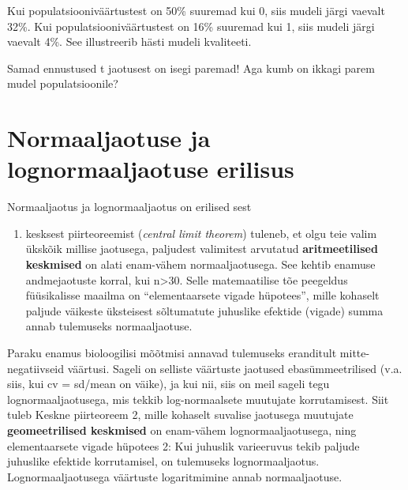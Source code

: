 \documentclass[]{book}
\newenvironment{Shaded}{\begin{snugshade}}{\end{snugshade}}
\newcommand{\KeywordTok}[1]{\textcolor[rgb]{0.13,0.29,0.53}{\textbf{#1}}}
\newcommand{\DecValTok}[1]{\textcolor[rgb]{0.00,0.00,0.81}{#1}}
\newcommand{\StringTok}[1]{\textcolor[rgb]{0.31,0.60,0.02}{#1}}
\newcommand{\CommentTok}[1]{\textcolor[rgb]{0.56,0.35,0.01}{\textit{#1}}}
\newcommand{\OperatorTok}[1]{\textcolor[rgb]{0.81,0.36,0.00}{\textbf{#1}}}
\newcommand{\NormalTok}[1]{#1}
\providecommand{\tightlist}{%
  \setlength{\itemsep}{0pt}\setlength{\parskip}{0pt}}
\begin{document}
Kui populatsiooniväärtustest on 50\% suuremad kui 0, siis mudeli järgi
vaevalt 32\%. Kui populatsiooniväärtustest on 16\% suuremad kui 1, siis
mudeli järgi vaevalt 4\%. See illustreerib hästi mudeli kvaliteeti.

\begin{Shaded}
\end{Shaded}

Samad ennustused t jaotusest on isegi paremad! Aga kumb on ikkagi parem
mudel populatsioonile?

\section*{Normaaljaotuse ja lognormaaljaotuse
erilisus}\label{normaaljaotuse-ja-lognormaaljaotuse-erilisus}

Normaaljaotus ja lognormaaljaotus on erilised sest

\begin{enumerate}
\def\labelenumi{(\arabic{enumi})}
\tightlist
\item
  kesksest piirteoreemist (\emph{central limit theorem}) tuleneb, et
  olgu teie valim ükskõik millise jaotusega, paljudest valimitest
  arvutatud \textbf{aritmeetilised keskmised} on alati enam-vähem
  normaaljaotusega. See kehtib enamuse andmejaotuste korral, kui
  n\textgreater{}30. Selle matemaatilise tõe peegeldus füüsikalisse
  maailma on ``elementaarsete vigade hüpotees'', mille kohaselt paljude
  väikeste üksteisest sõltumatute juhuslike efektide (vigade) summa
  annab tulemuseks normaaljaotuse.
\end{enumerate}

Paraku enamus bioloogilisi mõõtmisi annavad tulemuseks eranditult
mitte-negatiivseid väärtusi. Sageli on selliste väärtuste jaotused
ebasümmeetrilised (v.a. siis, kui cv = sd/mean on väike), ja kui nii,
siis on meil sageli tegu lognormaaljaotusega, mis tekkib log-normaalsete
muutujate korrutamisest. Siit tuleb Keskne piirteoreem 2, mille kohaselt
suvalise jaotusega muutujate \textbf{geomeetrilised keskmised} on
enam-vähem lognormaaljaotusega, ning elementaarsete vigade hüpotees 2:
Kui juhuslik varieeruvus tekib paljude juhuslike efektide korrutamisel,
on tulemuseks lognormaaljaotus. Lognormaaljaotusega väärtuste
logaritmimine annab normaaljaotuse.
\end{document}
